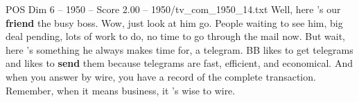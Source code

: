 \begin{textsample}{POS Dim 6 – 1950 – Score 2.00 – 1950/tv\_com\_1950\_14.txt}  \label{ex:f6_pos_013}
Well, here 's our \textbf{friend} the busy boss.
Wow, just look at him go.
People waiting to see him, big deal pending, lots of work to do, no time to go through the mail now.
But wait, here 's something he always makes time for, a telegram.
BB likes to get telegrams and likes to \textbf{send} them because telegrams are fast, efficient, and economical.
And when you answer by wire, you have a record of the complete transaction.
Remember, when it means business, it 's wise to wire.

\end{textsample}
